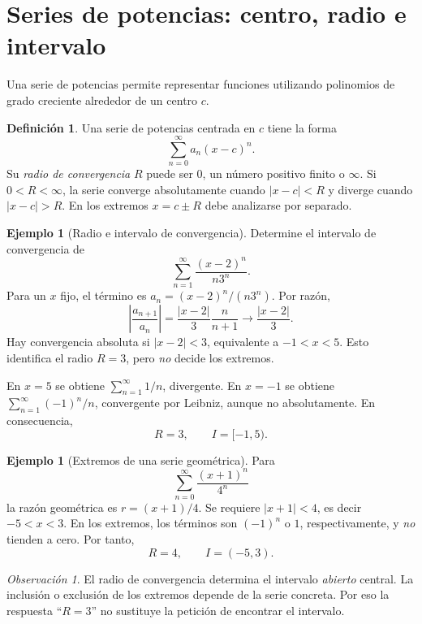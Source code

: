 \documentclass[12pt]{article}
\theoremstyle{definition}
\newtheorem{definicion}[teorema]{Definición}
\newtheorem{ejemplo}[teorema]{Ejemplo}
\theoremstyle{remark}
\newtheorem*{observacion}{Observación}
\begin{document}
\section{Series de potencias: centro, radio e intervalo}
Una serie de potencias permite representar funciones utilizando polinomios de grado creciente alrededor de un centro $c$.
\begin{definicion}
Una serie de potencias centrada en $c$ tiene la forma
\[\boxed{\sum_{n=0}^\infty a_n(x-c)^n.}\]
Su \emph{radio de convergencia} $R$ puede ser $0$, un número positivo finito o $\infty$. Si $0<R<\infty$, la serie converge absolutamente cuando $|x-c|<R$ y diverge cuando $|x-c|>R$. En los extremos $x=c\pm R$ debe analizarse por separado.
\end{definicion}
\begin{ejemplo}[Radio e intervalo de convergencia]
Determine el intervalo de convergencia de
\[\sum_{n=1}^\infty\frac{(x-2)^n}{n3^n}.\]
Para un $x$ fijo, el término es $a_n=(x-2)^n/(n3^n)$. Por razón,
\[\left|\frac{a_{n+1}}{a_n}\right|
=\frac{|x-2|}{3}\frac{n}{n+1}
\longrightarrow\frac{|x-2|}{3}.\]
Hay convergencia absoluta si $|x-2|<3$, equivalente a $-1<x<5$. Esto identifica el radio $R=3$, pero \emph{no} decide los extremos.

En $x=5$ se obtiene $\sum_{n=1}^\infty1/n$, divergente. En $x=-1$ se obtiene $\sum_{n=1}^\infty(-1)^n/n$, convergente por Leibniz, aunque no absolutamente. En consecuencia,
\[\boxed{R=3,\qquad I=[-1,5).}\]
\end{ejemplo}
\begin{ejemplo}[Extremos de una serie geométrica]
Para
\[\sum_{n=0}^\infty\frac{(x+1)^n}{4^n}\]
la razón geométrica es $r=(x+1)/4$. Se requiere $|x+1|<4$, es decir $-5<x<3$. En los extremos, los términos son $(-1)^n$ o $1$, respectivamente, y \emph{no} tienden a cero. Por tanto,
\[\boxed{R=4,\qquad I=(-5,3).}\]
\end{ejemplo}
\begin{observacion}
El radio de convergencia determina el intervalo \emph{abierto} central. La inclusión o exclusión de los extremos depende de la serie concreta. Por eso la respuesta ``$R=3$'' no sustituye la petición de encontrar el intervalo.
\end{observacion}

\end{document}
